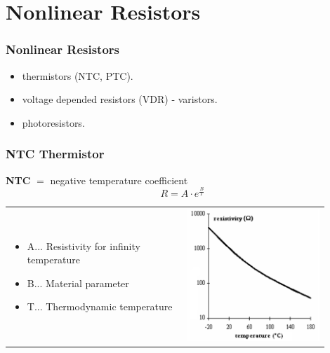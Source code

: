 \documentclass{beamer}
\begin{document}
\section{\texorpdfstring{Nonlinear Resistors}{Nonlinear Resistors}}
	\begin{frame}
    \frametitle{Nonlinear Resistors}
		\begin{itemize}
			\item thermistors (NTC, PTC). 
			\item voltage depended resistors (VDR) - varistors.
			\item photoresistors.
		\end{itemize}
  \end{frame}
	\begin{frame}
    \frametitle{NTC Thermistor}
		\textbf{NTC} $=$ negative temperature coefficient
		$$R=A\cdot e^\frac{B}{T}$$
		\begin{tabular}{m{0.5\linewidth} m{0.4\linewidth}}
			\begin{itemize}
				\item A... Resistivity for infinity temperature
				\item B... Material parameter
				\item T... Thermodynamic temperature
			\end{itemize} & \includegraphics[scale=0.4]{obr08_zavislostNaTep.png}
		\end{tabular}
  \end{frame}
\end{document}
